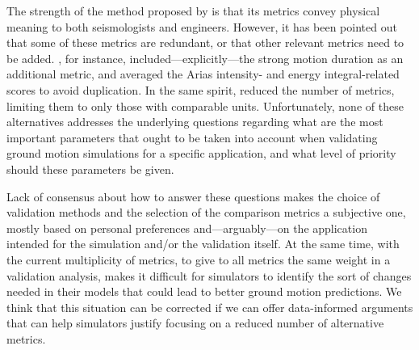 The strength of the method proposed by \citet{Anderson_2004_Proc} is that its metrics convey physical meaning to both seismologists and engineers. However, it has been pointed out that some of these metrics are redundant, or that other relevant metrics need to be added. \citet{Taborda_2013_BSSA}, for instance, included---explicitly---the strong motion duration \citep{Trifunac_1975_BSSA} as an additional metric, and averaged the Arias intensity- and energy integral-related scores to avoid duplication. In the same spirit, \citet{Maufroy_2015_BSSA} reduced the number of metrics, limiting them to only those with comparable units. Unfortunately, none of these alternatives addresses the underlying questions regarding what are the most important parameters that ought to be taken into account when validating ground motion simulations for a specific application, and what level of priority should these parameters be given.

Lack of consensus about how to answer these questions makes the choice of validation methods and the selection of the comparison metrics a subjective one, mostly based on personal preferences and---arguably---on the application intended for the simulation and/or the validation itself. At the same time, with the current multiplicity of metrics, to give to all metrics the same weight in a validation analysis, makes it difficult for simulators to identify the sort of changes needed in their models that could lead to better ground motion predictions. We think that this situation can be corrected if we can offer data-informed arguments that can help simulators justify focusing on a reduced number of alternative metrics.

